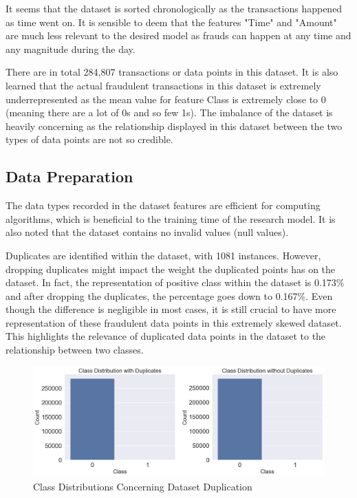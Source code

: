 \documentclass[12pt, letterpaper]{article}
\begin{document}
        \par It seems that the dataset is sorted chronologically as the transactions happened as time went on. It is sensible to deem that the features "Time" and "Amount" are much less relevant to the desired model as frauds can happen at any time and any magnitude during the day.

        \par There are in total 284,807 transactions or data points in this dataset. It is also learned that the actual fraudulent transactions in this dataset is extremely underrepresented as the mean value for feature Class is extremely close to 0 (meaning there are a lot of 0s and so few 1s). The imbalance of the dataset is heavily concerning as the relationship displayed in this dataset between the two types of data points are not so credible.        

    \subsection{Data Preparation}
        The data types recorded in the dataset features are efficient for computing algorithms, which is beneficial to the training time of the research model. It is also noted that the dataset contains no invalid values (null values).

        \par Duplicates are identified within the dataset, with 1081 instances. However, dropping duplicates might impact the weight the duplicated points has on the dataset. In fact, the representation of positive class within the dataset is 0.173\% and after dropping the duplicates, the percentage goes down to 0.167\%. Even though the difference is negligible in most cases, it is still crucial to have more representation of these fraudulent data points in this extremely skewed dataset. This highlights the relevance of duplicated data points in the dataset to the relationship between two classes.
        
        \begin{figure}[h]
            \centering
            \includegraphics[width=1\linewidth]{Figures/Class-representation.png}
            \caption{Class Distributions Concerning Dataset Duplication}
            \label{fig:enter-label}
        \end{figure}
        
\end{document}
